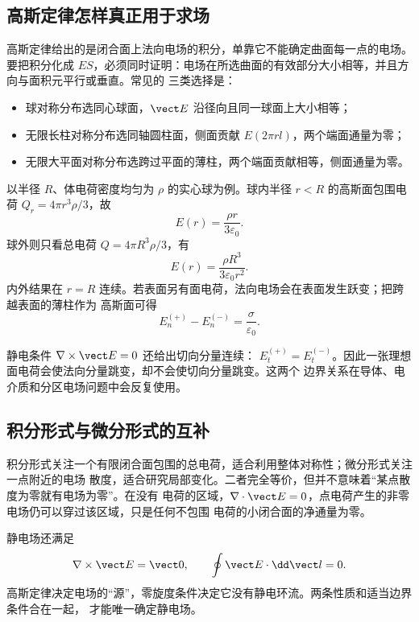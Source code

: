 \subsection*{高斯定律怎样真正用于求场}

高斯定律给出的是闭合面上法向电场的积分，单靠它不能确定曲面每一点的电场。要把积分化成
$ES$，必须同时证明：电场在所选曲面的有效部分大小相等，并且方向与面积元平行或垂直。常见的
三类选择是：
\begin{itemize}
  \item 球对称分布选同心球面，$\vect E$ 沿径向且同一球面上大小相等；
  \item 无限长柱对称分布选同轴圆柱面，侧面贡献 $E(2\pi rl)$，两个端面通量为零；
  \item 无限大平面对称分布选跨过平面的薄柱，两个端面贡献相等，侧面通量为零。
\end{itemize}

以半径 $R$、体电荷密度均匀为 $\rho$ 的实心球为例。球内半径 $r<R$ 的高斯面包围电荷
$Q_r=4\pi r^3\rho/3$，故
\begin{equation}
 E(r)=\frac{\rho r}{3\varepsilon_0}.
\end{equation}
球外则只看总电荷 $Q=4\pi R^3\rho/3$，有
\begin{equation}
 E(r)=\frac{\rho R^3}{3\varepsilon_0r^2}.
\end{equation}
内外结果在 $r=R$ 连续。若表面另有面电荷，法向电场会在表面发生跃变；把跨越表面的薄柱作为
高斯面可得
\begin{equation}
 E_n^{(+)}-E_n^{(-)}=\frac{\sigma}{\varepsilon_0}.
\end{equation}

静电条件 $\nabla\times\vect E=0$ 还给出切向分量连续：
$E_t^{(+)}=E_t^{(-)}$。因此一张理想面电荷会使法向分量跳变，却不会使切向分量跳变。这两个
边界关系在导体、电介质和分区电场问题中会反复使用。

\subsection*{积分形式与微分形式的互补}

积分形式关注一个有限闭合面包围的总电荷，适合利用整体对称性；微分形式关注一点附近的电场
散度，适合研究局部变化。二者完全等价，但并不意味着“某点散度为零就有电场为零”。在没有
电荷的区域，$\nabla\cdot\vect E=0$，点电荷产生的非零电场仍可以穿过该区域，只是任何不包围
电荷的小闭合面的净通量为零。

静电场还满足
\begin{equation}
 \nabla\times\vect E=\vect0,
 \qquad
 \oint\vect E\cdot\dd\vect l=0.
\end{equation}
高斯定律决定电场的“源”，零旋度条件决定它没有静电环流。两条性质和适当边界条件合在一起，
才能唯一确定静电场。
